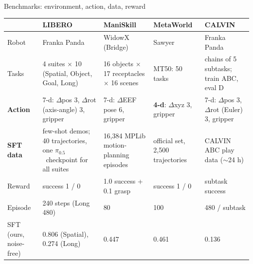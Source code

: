 \documentclass[aspectratio=169,11pt]{beamer}
\newcommand{\pifive}{$\pi_{0.5}$}
\begin{document}
\begin{frame}{Benchmarks: environment, action, data, reward}
  \scriptsize
  \begin{tabularx}{\linewidth}{@{}l Y Y Y Y@{}}
    \toprule
    & LIBERO & ManiSkill & MetaWorld & CALVIN \\
    \midrule
    Robot & Franka Panda & WidowX (Bridge) & Sawyer & Franka Panda \\
    Tasks & 4 suites $\times$ 10 (Spatial, Object, Goal, Long) & 16 objects $\times$ 17 receptacles $\times$ 16 scenes & MT50: 50 tasks & chains of 5 subtasks; train ABC, eval D \\
    \textbf{Action} & 7-d: $\Delta$pos 3, $\Delta$rot (axis-angle) 3, gripper & 7-d: $\Delta$EEF pose 6, gripper & \textbf{4-d}: $\Delta$xyz 3, gripper & 7-d: $\Delta$pos 3, $\Delta$rot (Euler) 3, gripper \\
    \textbf{SFT data} & few-shot demos; 40 trajectories, one \pifive\ checkpoint for all suites & 16,384 MPLib motion-planning episodes & official set, 2,500 trajectories & CALVIN ABC play data ($\sim$24 h) \\
    Reward & success 1 / 0 & 1.0 success + 0.1 grasp & success 1 / 0 & subtask success \\
    Episode & 240 steps (Long 480) & 80 & 100 & 480 / subtask \\
    SFT (ours, noise-free) & 0.806 (Spatial), 0.274 (Long) & 0.447 & 0.461 & 0.136 \\
    \bottomrule
  \end{tabularx}
\end{frame}
\end{document}
